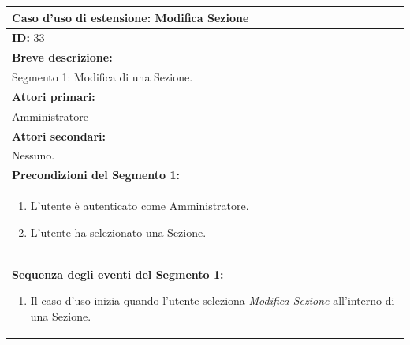 \documentclass{article}
\begin{document}
                \begin{table}[H]
                    \begin{tabular}{|p{\linewidth}|}
                        \hline
                        \cellcolor{gray!100}
                        \color{white}
                        \centerline{\textbf{Caso d'uso di estensione:} Modifica Sezione} \\
                        \hline
                        \textbf{ID:} 33 \\
                        \hline
                        \cellcolor{gray!20}
                        \textbf{Breve descrizione:} \\
                        \cellcolor{gray!20}
                        Segmento 1: Modifica di una Sezione. \\
                        \hline
                        \textbf{Attori primari:} \\
                        \begin{minipage}{\linewidth}
                            Amministratore
                        \end{minipage}
                        \vspace{-10pt} \\ 
                        \hline
                        \textbf{Attori secondari:} \\
                        Nessuno. \\
                        \hline
                        \cellcolor{gray!20}
                        \textbf{Precondizioni del Segmento 1:} \\
                        \cellcolor{gray!20}
                        \begin{minipage}{\linewidth}
                            \begin{enumerate}
                                \item L'utente è autenticato come Amministratore.
                                \item L'utente ha selezionato una Sezione.
                            \end{enumerate}
                        \end{minipage} \\
                        \hline
                        \textbf{Sequenza degli eventi del Segmento 1:}
                        \begin{enumerate}
                            \item Il caso d'uso inizia quando l'utente seleziona \textit{Modifica Sezione} all'interno di una Sezione.

\end{enumerate}
\end{tabular}
\end{table}
\end{document}
